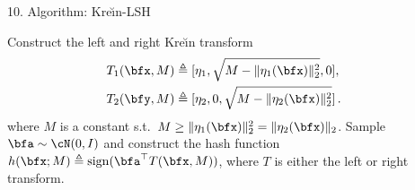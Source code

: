 \documentclass[final]{beamer}
\newcommand{\kr}{Kre\u{\i}n\xspace}
\DeclareMathOperator{\sign}{sign}
\newlength{\sepwid}
\newlength{\onecolwid}
\begin{document}
\begin{frame}[t]
\begin{columns}[t]
\begin{column}{\onecolwid}
\begin{block}{10. Algorithm: \kr-LSH}
\begin{algorithmic}[1]
				\State Construct the left and right \kr transform
				\begin{align*}
				T_1(\bfx,M) \triangleq{} & 
				[\eta_1,\sqrt{M-\|\eta_1(\bfx)\|^2_2},0],\\ T_2(\bfy,M) 
				\triangleq{} &
				[\eta_2,0,\sqrt{M-\|\eta_2(\bfx)\|^2_2}]\,.
				\end{align*}
				where $ M $ is a constant s.t.\ $ M\ge \|\eta_1(\bfx)\|_2^2 = \|\eta_2(\bfx)\|_2
				$.
				\State Sample $\bfa\sim \cN(0,I)$ and construct the hash 
				function 
				$ h(\bfx; M)\triangleq \sign(\bfa^\top T(\bfx, M))$,
				where $T$ is either the left or right 
				transform.\label{ln:simple-lsh}
			\end{algorithmic}
        \end{block}
\end{column}
 \begin{column}{\sepwid}
 
 \end{column}
		
	\end{columns} %
	
\end{frame} %
\end{document}
